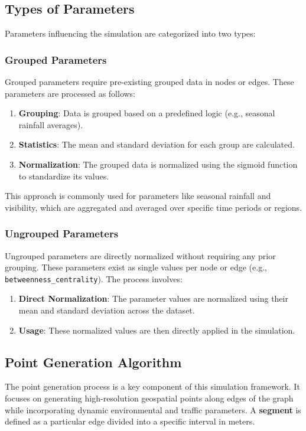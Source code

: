 \documentclass[sigplan,screen]{acmart}
\begin{document}
\subsection{Types of Parameters}
Parameters influencing the simulation are categorized into two types:

\subsubsection{Grouped Parameters}
Grouped parameters require pre-existing grouped data in nodes or edges. These parameters are processed as follows:

\begin{enumerate}
    \item \textbf{Grouping}: Data is grouped based on a predefined logic (e.g., seasonal rainfall averages).
    \item \textbf{Statistics}: The mean and standard deviation for each group are calculated.
    \item \textbf{Normalization}: The grouped data is normalized using the sigmoid function to standardize its values.
\end{enumerate}

This approach is commonly used for parameters like seasonal rainfall and visibility, which are aggregated and averaged over specific time periods or regions.

\subsubsection{Ungrouped Parameters}
Ungrouped parameters are directly normalized without requiring any prior grouping. These parameters exist as single values per node or edge (e.g., \texttt{betweenness\_centrality}). The process involves:

\begin{enumerate}
    \item \textbf{Direct Normalization}: The parameter values are normalized using their mean and standard deviation across the dataset.
    \item \textbf{Usage}: These normalized values are then directly applied in the simulation.
\end{enumerate}

\subsection{Point Generation Algorithm}
The point generation process is a key component of this simulation framework. It focuses on generating high-resolution geospatial points along edges of the graph while incorporating dynamic environmental and traffic parameters. A \textbf{segment} is defined as a particular edge divided into a specific interval in meters.
\end{document}
